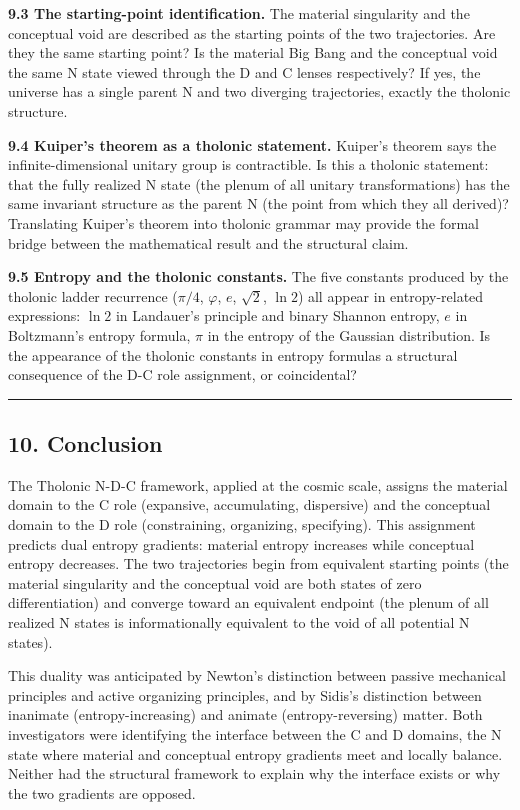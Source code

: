 \documentclass[
  11pt,
  letterpaper,
]{article}
\begin{document}
\textbf{9.3 The starting-point identification.} The material singularity
and the conceptual void are described as the starting points of the two
trajectories. Are they the same starting point? Is the material Big Bang
and the conceptual void the same N state viewed through the D and C
lenses respectively? If yes, the universe has a single parent N and two
diverging trajectories, exactly the tholonic structure.

\textbf{9.4 Kuiper's theorem as a tholonic statement.} Kuiper's theorem
says the infinite-dimensional unitary group is contractible. Is this a
tholonic statement: that the fully realized N state (the plenum of all
unitary transformations) has the same invariant structure as the parent
N (the point from which they all derived)? Translating Kuiper's theorem
into tholonic grammar may provide the formal bridge between the
mathematical result and the structural claim.

\textbf{9.5 Entropy and the tholonic constants.} The five constants
produced by the tholonic ladder recurrence (\(\pi/4\), \(\varphi\),
\(e\), \(\sqrt{2}\), \(\ln 2\)) all appear in entropy-related
expressions: \(\ln 2\) in Landauer's principle and binary Shannon
entropy, \(e\) in Boltzmann's entropy formula, \(\pi\) in the entropy of
the Gaussian distribution. Is the appearance of the tholonic constants
in entropy formulas a structural consequence of the D-C role assignment,
or coincidental?

\begin{center}\rule{0.5\linewidth}{0.5pt}\end{center}

\subsection{10. Conclusion}\label{conclusion}

The Tholonic N-D-C framework, applied at the cosmic scale, assigns the
material domain to the C role (expansive, accumulating, dispersive) and
the conceptual domain to the D role (constraining, organizing,
specifying). This assignment predicts dual entropy gradients: material
entropy increases while conceptual entropy decreases. The two
trajectories begin from equivalent starting points (the material
singularity and the conceptual void are both states of zero
differentiation) and converge toward an equivalent endpoint (the plenum
of all realized N states is informationally equivalent to the void of
all potential N states).

This duality was anticipated by Newton's distinction between passive
mechanical principles and active organizing principles, and by Sidis's
distinction between inanimate (entropy-increasing) and animate
(entropy-reversing) matter. Both investigators were identifying the
interface between the C and D domains, the N state where material and
conceptual entropy gradients meet and locally balance. Neither had the
structural framework to explain why the interface exists or why the two
gradients are opposed.
\end{document}
